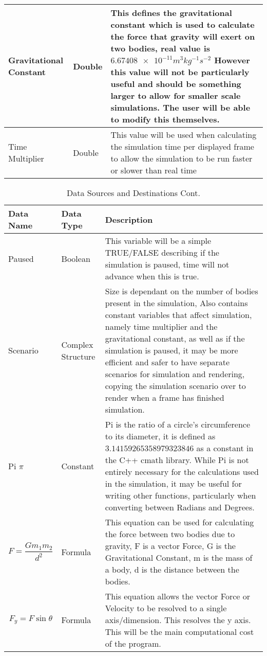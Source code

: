 \begin{table}[htbp]
\begin{tabular}{|M{3cm}|M{3cm}|m{8cm}|}
\hline
Gravitational Constant & Double & This defines the gravitational constant which is used to calculate the force that gravity will exert on two bodies, real value is $\num{6.67408e-11} m^{3} kg^{-1} s^{-2}$ However this value will not be particularly useful and should be something larger to allow for smaller scale simulations. The user will be able to modify this themselves. \\
\hline
Time Multiplier & Double & This value will be used when calculating the simulation time per displayed frame to allow the simulation to be run faster or slower than real time \\
\hline
\end{tabular}
\end{table} 

\begin{table}[htbp]
\caption{Data Sources and Destinations Cont.}
\centering
\footnotesize
\def\arraystretch{1.5}
\begin{tabular}{|M{3cm}|M{3cm}|m{8cm}|}
\hline 
\textbf{Data Name} & \textbf{Data Type} & \textbf{Description} \\
\hline
Paused & Boolean & This variable will be a simple TRUE/FALSE describing if the simulation is paused, time will not advance when this is true. \\
\hline
Scenario & Complex Structure & Size is dependant on the number of bodies present in the simulation, Also contains constant variables that affect simulation, namely time multiplier and the gravitational constant, as well as if the simulation is paused, it may be more efficient and safer to have separate scenarios for simulation and rendering, copying the simulation scenario over to render when a frame has finished simulation. \\
\hline
Pi $\pi$ & Constant & Pi is the ratio of a circle's circumference to its diameter, it is defined as $3.14159265358979323846$ as a constant in the C++ cmath library. While Pi is not entirely necessary for the calculations used in the simulation, it may be useful for writing other functions, particularly when converting between Radians and Degrees. \\
\hline
$$F=\frac{Gm_1m_2}{d^2}$$ & Formula & This equation can be used for calculating the force between two bodies due to gravity, F is a vector Force, G is the Gravitational Constant, m is the mass of a body, d is the distance between the bodies. \\
\hline
$$F_y=F\sin{\theta}$$ & Formula & This equation allows the vector Force or Velocity to be resolved to a single axis/dimension. This resolves the y axis. This will be the main computational cost of the program. \\

\end{tabular}
\end{table}
